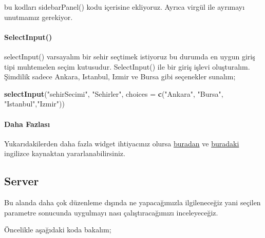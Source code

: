 \documentclass[]{book}
\newenvironment{Shaded}{\begin{snugshade}}{\end{snugshade}}
\newcommand{\KeywordTok}[1]{\textcolor[rgb]{0.13,0.29,0.53}{\textbf{#1}}}
\newcommand{\DataTypeTok}[1]{\textcolor[rgb]{0.13,0.29,0.53}{#1}}
\newcommand{\DecValTok}[1]{\textcolor[rgb]{0.00,0.00,0.81}{#1}}
\newcommand{\StringTok}[1]{\textcolor[rgb]{0.31,0.60,0.02}{#1}}
\newcommand{\OperatorTok}[1]{\textcolor[rgb]{0.81,0.36,0.00}{\textbf{#1}}}
\newcommand{\NormalTok}[1]{#1}
\let\oldparagraph\paragraph
\renewcommand{\paragraph}[1]{\oldparagraph{#1}\mbox{}}
\begin{document}
bu kodları sidebarPanel() kodu içerisine ekliyoruz. Ayrıca virgül ile
ayrımayı unutmamız gerekiyor.

\paragraph{SelectInput()}\label{selectinput}

selectInput() varsayalım bir sehir seçtimek istiyoruz bu durumda en
uygun giriş tipi muhtemelen seçim kutusudur. SelectInput() ile bir giriş
işlevi oluşturalım. Şimdilik sadece Ankara, Istanbul, Izmir ve Bursa
gibi seçenekler sunalım;

\begin{Shaded}
\begin{Highlighting}[]
\KeywordTok{selectInput}\NormalTok{(}\StringTok{"sehirSecimi"}\NormalTok{, }\StringTok{"Sehirler"}\NormalTok{,}
            \DataTypeTok{choices =} \KeywordTok{c}\NormalTok{(}\StringTok{"Ankara"}\NormalTok{, }\StringTok{"Bursa"}\NormalTok{, }\StringTok{"Istanbul"}\NormalTok{,}\StringTok{"Izmir"}\NormalTok{))}
\end{Highlighting}
\end{Shaded}

\paragraph{Daha Fazlası}\label{daha-fazlas-1}

Yukarıdakilerden daha fazla widget ihtiyacınız olursa
\href{https://shiny.rstudio.com/tutorial/written-tutorial/lesson3/}{buradan}
ve
\href{https://shiny.rstudio.com/tutorial/written-tutorial/lesson4/}{buradaki}
ingilizce kaynaktan yararlanabilirsiniz.

\subsection{Server}\label{server}

Bu alanda daha çok düzenleme dışında ne yapacağımızla ilgileneceğiz yani
seçilen parametre sonucunda uygulmayı nası çalıştıracağımızı
inceleyeceğiz.

Öncelikle aşağıdaki koda bakalım;

\begin{Shaded}
\end{Shaded}
\end{document}
